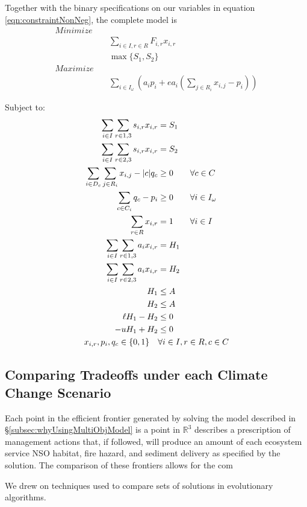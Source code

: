 Together with the binary specifications on our variables in equation \eqref{eqn:constraintNonNeg}, the complete model is
\begin{align*}
Minimize \quad & \\
&\sum_{i\in I,r\in R} F_{i,r} x_{i,r}\\
&\max \{S_1,S_2\}\\
Maximize \quad & \\
&\sum_{i\in I_\omega} \left(a_i p_i + e a_i \left( \sum_{j \in R_i} x_{i,j}-p_i \right) \right)
\end{align*}

Subject to:
\begin{align}
\sum_{i\in I} \sum_{r\in 1,3} s_{i,r} x_{i,r} &= S_1 \notag\\
\sum_{i\in I} \sum_{r\in 2,3} s_{i,r} x_{i,r} &= S_2 \notag\\
\sum_{i \in D_c} \sum_{j \in R_i}x_{i,j} - |c| q_c &\ge 0 \qquad \forall c \in C \notag\\
\sum_{c \in C_i} q_c - p_i &\ge 0 \qquad \forall i \in I_\omega \notag\\
\sum_{r \in R} x_{i,r} &= 1  \qquad \forall i \in I \notag\\
\sum_{i \in I} \sum_{r \in 1,3} a_i x_{i,r} &= H_1 \notag\\
\sum_{i \in I} \sum_{r \in 2,3} a_i x_{i,r} &= H_2 \notag\\
H_1 &\le A \notag\\
H_2 &\le A \notag\\
\ell H_1 - H_2 &\le 0 \notag\\
-u H_1 + H_2 &\le 0 \notag\\
x_{i,r}, p_i, q_c \in \{0,1\} \quad &\forall i \in I, r \in R, c \in C \label{eqn:constraintNonNeg}
\end{align}


\subsection{Comparing Tradeoffs under each Climate Change Scenario}
Each point in the efficient frontier generated by solving the model described in \S \ref{subsec:whyUsingMultiObjModel} is a point in $\mathbb{R}^3$ describes a prescription of management actions that, if followed, will produce an amount of each ecosystem service NSO habitat, fire hazard, and sediment delivery as specified by the solution. The comparison of these frontiers allows for the com

We drew on techniques used to compare sets of solutions in evolutionary algorithms.

